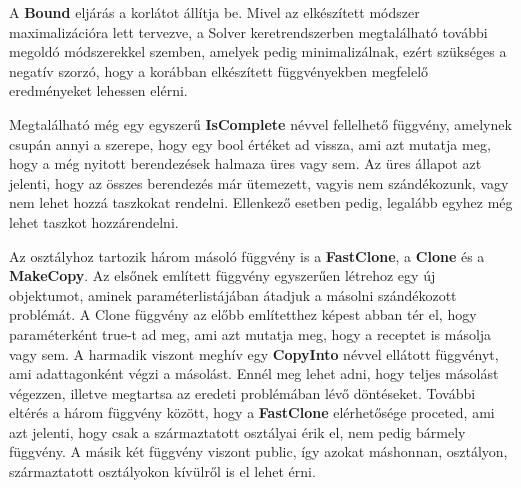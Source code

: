 A \textbf{Bound} eljárás a korlátot állítja be.
Mivel az elkészített módszer maximalizációra lett tervezve, a Solver keretrendszerben megtalálható további megoldó módszerekkel szemben, amelyek pedig minimalizálnak, ezért szükséges a negatív szorzó, hogy a korábban elkészített függvényekben megfelelő eredményeket lehessen elérni.

Megtalálható még egy egyszerű \textbf{IsComplete} névvel fellelhető függvény, amelynek csupán annyi a szerepe, hogy egy bool értéket ad vissza, ami azt mutatja meg, hogy a még nyitott berendezések halmaza üres vagy sem.
Az üres állapot azt jelenti, hogy az összes berendezés már ütemezett, vagyis nem szándékozunk, vagy nem lehet hozzá taszkokat rendelni. Ellenkező esetben pedig, legalább egyhez még lehet taszkot hozzárendelni.

Az osztályhoz tartozik három másoló függvény is a \textbf{FastClone}, a \textbf{Clone} és a \textbf{MakeCopy}.
Az elsőnek említett függvény egyszerűen létrehoz egy új objektumot, aminek paraméterlistájában átadjuk a másolni szándékozott problémát.
A Clone függvény az előbb említetthez képest abban tér el, hogy paraméterként true-t ad meg, ami azt mutatja meg, hogy a receptet is másolja vagy sem.
A harmadik viszont meghív egy \textbf{CopyInto} névvel ellátott függvényt, ami adattagonként végzi a másolást.
Ennél meg lehet adni, hogy teljes másolást végezzen, illetve megtartsa az eredeti problémában lévő döntéseket.
További eltérés a három függvény között, hogy a \textbf{FastClone} elérhetősége proceted, ami azt jelenti, hogy csak a származtatott osztályai érik el, nem pedig bármely függvény.
A másik két függvény viszont public, így azokat máshonnan, osztályon, származtatott osztályokon kívülről is el lehet érni.

